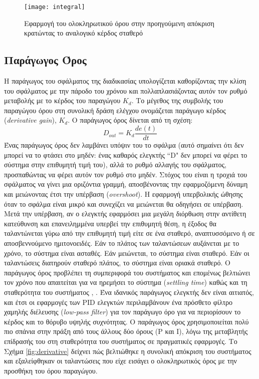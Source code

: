 \begin{figure}[h]
  \centering
  \texttt{[image: integral]}
  \caption{Εφαρμογή του ολοκληρωτικού όρου στην προηγούμενη απόκριση κρατώντας το αναλογικό κέρδος σταθερό}
  \label{fig:integral}
\end{figure}

\subsection{Παράγωγος Όρος}

Η παράγωγος του σφάλματος της διαδικασίας υπολογίζεται καθορίζοντας την κλίση του σφάλματος με την πάροδο του χρόνου και πολλαπλασιάζοντας αυτόν τον ρυθμό μεταβολής με το κέρδος του παραγώγου $K_d$. Το μέγεθος της συμβολής του παραγώγου όρου στη συνολική δράση ελέγχου ονομάζεται παράγωγο κέρδος (\emph{derivative gain}), $K_d$. Ο παράγωγος όρος δίνεται από τη σχέση:
\begin{equation}
D_{out}=K_d \frac{de(t)}{dt}
\label{eq:dout}
\end{equation}
Ένας παράγωγος όρος δεν λαμβάνει υπόψιν του το σφάλμα (αυτό σημαίνει ότι δεν μπορεί να το φτάσει στο μηδέν: ένας καθαρός ελεγκτής ``D" δεν μπορεί να φέρει το σύστημα στην επιθυμητή τιμή του), αλλά το ρυθμό αλλαγής του σφάλματος, προσπαθώντας να φέρει αυτόν τον ρυθμό στο μηδέν. Στόχος του είναι η τροχιά του σφάλματος να γίνει μια οριζόντια γραμμή, αποσβένοντας την εφαρμοζόμενη δύναμη και μειώνοντας έτσι την υπέρβαση (\emph{overshoot}). Η εφαρμογή υπερβολικής ώθησης όταν το σφάλμα είναι μικρό και συνεχίζει να μειώνεται θα οδηγήσει σε υπέρβαση. Μετά την υπέρβαση, αν ο ελεγκτής εφαρμόσει μια μεγάλη διόρθωση στην αντίθετη κατεύθυνση και επανειλημμένα υπερβεί την επιθυμητή θέση, η έξοδος θα ταλαντώνεται γύρω από την επιθυμητή τιμή είτε σε ένα σταθερό, αναπτυσσόμενο ή σε αποσβεννούμενο ημιτονοειδές. Εάν το πλάτος των ταλαντώσεων αυξάνεται με το χρόνο, το σύστημα είναι ασταθές. Εάν μειώνεται, το σύστημα είναι σταθερό. Εάν οι ταλαντώσεις διατηρούν σταθερό πλάτος, το σύστημα είναι οριακά σταθερό. Ο παράγωγος όρος προβλέπει τη συμπεριφορά του συστήματος και επομένως βελτιώνει τον χρόνο που απαιτείται για να ηρεμήσει το σύστημα (\emph{settling time}) καθώς και τη σταθερότητα του συστήματος \cite{michigan}, \cite{wescott}. Ένα ιδανικός παράγωγος ελεγκτής δεν είναι αιτιατός, και έτσι οι εφαρμογές των PID ελεγκτών περιλαμβάνουν ένα πρόσθετο φίλτρο χαμηλής διέλευσης (\emph{low-pass filter}) για τον παράγωγο όρο για να περιορίσουν το κέρδος και το θόρυβο υψηλής συχνότητας. Ο παράγωγος όρος χρησιμοποιείται πολύ πιο σπάνια στην πράξη από τους άλλους δύο όρους (P και I), λόγω της μεταβλητής επίδρασής του στη σταθερότητα του συστήματος σε πραγματικές εφαρμογές. Το Σχήμα \ref{fig:derivative} δείχνει πώς βελτιώθηκε η συνολική απόκριση του συστήματος και εξαλείφθηκαν οι ταλαντώσεις που είχε εισάγει ο ολοκληρωτικός όρος με την προσθήκη του όρου παραγώγου.

